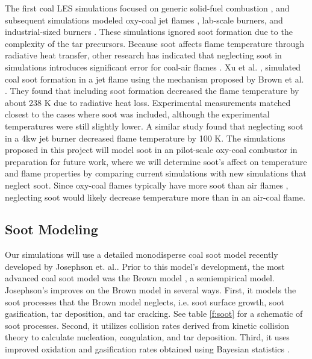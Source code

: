 \documentclass[review,3p]{elsarticle}
\begin{document}
		
	
	The first coal LES simulations focused on generic solid-fuel combustion \citep{Kurose2003}, and subsequent simulations modeled oxy-coal jet flames \citep{Yamamoto20111771}, lab-scale burners\citep{Stein2012}, and industrial-sized burners \citep{Kurose2009} \citep{Gharebaghi2011}.  These simulations ignored soot formation due to the complexity of the tar precursors.  Because soot affects flame temperature through radiative heat transfer, other research has indicated that neglecting soot in simulations introduces significant error for coal-air flames \cite{Xu2017}\cite{Takahashi2019}.  Xu et al. \cite{Xu2017}, simulated coal soot formation in a jet flame using the mechanism proposed by Brown et al. \cite{Brown1998}.  They found that including soot formation decreased the flame temperature by about 238 K due to radiative heat loss.  Experimental measurements matched closest to the cases where soot was included, although the experimental temperatures were still slightly lower.  A similar study \cite{Takahashi2019} found that neglecting soot in a 4kw jet burner decreased flame temperature by 100 K.  The simulations proposed in this project will model soot in an pilot-scale oxy-coal combustor in preparation for future work, where we will determine soot's affect on temperature and flame properties by comparing current simulations with new simulations that neglect soot.  Since oxy-coal flames typically have more soot than air flames \cite{Stimpson2013}, neglecting soot would likely decrease temperature more than in an air-coal flame. 


\subsection{Soot Modeling}

	Our simulations will use a detailed monodisperse coal soot model recently developed by Josephson et. al.\cite{Josephson2019}.  Prior to this model's development, the most advanced coal soot model was the Brown model \cite{Brown1998}, a semiempirical model.  Josephson's improves on the Brown model in several ways. First, it models the soot processes that the Brown model neglects, i.e. soot surface growth, soot gasification, tar deposition, and tar cracking.  See table \ref{f:soot} for a schematic of soot processes.  Second, it utilizes collision rates derived from kinetic collision theory to calculate nucleation, coagulation, and tar deposition.  Third, it uses improved oxidation and gasification rates obtained using Bayesian statistics \cite{Josephson2017}.  
	
\end{document}
